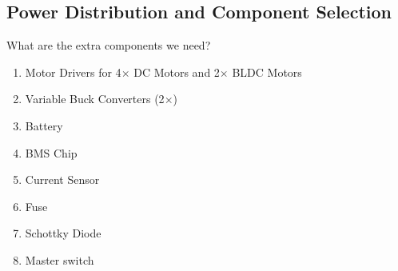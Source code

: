 \documentclass[12pt]{article}
\begin{document}
\subsection*{Power Distribution and Component Selection}
What are the extra components we need?
\begin{enumerate}
    \item Motor Drivers for 4$\times$ DC Motors and 2$\times$ BLDC Motors
    \item Variable Buck Converters (2$\times$)
    \item Battery
    \item BMS Chip
    \item Current Sensor
    \item Fuse
    \item Schottky Diode
    \item Master switch
\end{enumerate}
\end{document}

